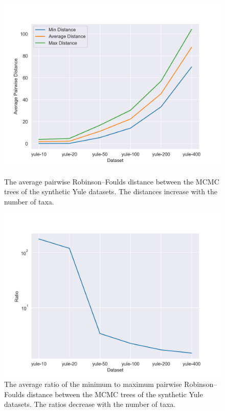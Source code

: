 \documentclass[10pt,letterpaper]{article}
\begin{document}
\begin{figure}[h]
    \centering
    \begin{minipage}[t]{0.45\textwidth}
        \centering
        \includegraphics[width=\textwidth]{figures/curse_distance.png}
        \caption{The average pairwise Robinson–Foulds distance between the MCMC trees of the synthetic Yule datasets. The distances increase with the number of taxa.}

		\label{fig:curse1}
    \end{minipage}
    \hfill
    \begin{minipage}[t]{0.45\textwidth}
        \centering
        \includegraphics[width=\textwidth]{figures/curse_ratio.png}
        \caption{The average ratio of the minimum to maximum pairwise Robinson–Foulds distance between the MCMC trees of the synthetic Yule datasets. The ratios decrease with the number of taxa.}

		\label{fig:curse2}
    \end{minipage}
\end{figure}
\end{document}
